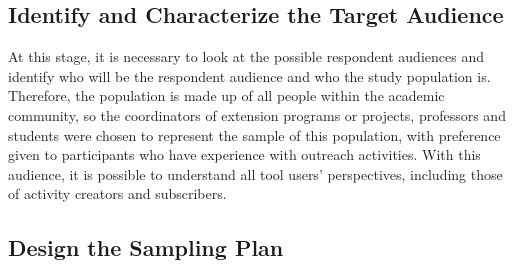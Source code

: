 \subsection{Identify and Characterize the Target Audience} \label{sec:survey-targets}

At this stage, it is necessary to look at the possible respondent audiences and identify who will be the respondent audience and who the study population is.
Therefore, the population is made up of all people within the academic community, so the coordinators of extension programs or projects, professors and students were chosen to represent the sample of this population, with preference given to participants who have experience with outreach activities.
With this audience, it is possible to understand all tool users' perspectives, including those of activity creators and subscribers.


\subsection{Design the Sampling Plan} \label{sec:survey-sampling}

